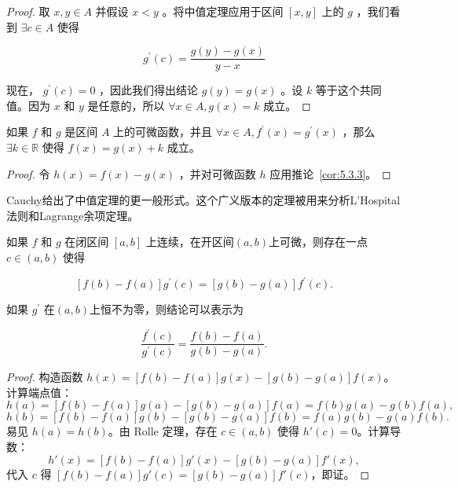 \begin{proof}
取 \(x,y \in  A\) 并假设 \(x < y\) 。将中值定理应用于区间 \(\left\lbrack  {x,y}\right\rbrack\) 上的 \(g\) ，我们看到 $\exists c\in A$ 使得

\[
{g}^{\prime }\left( c\right)  = \frac{g\left( y\right)  - g\left( x\right) }{y - x}
\]

现在， \({g}^{\prime }\left( c\right)  = 0\) ，因此我们得出结论 \(g\left( y\right)  = g\left( x\right)\) 。设 \(k\) 等于这个共同值。因为 \(x\) 和 \(y\) 是任意的，所以 \(\forall x \in  A,  g\left( x\right)  = k\) 成立。
\end{proof}


\begin{Cor}
  \label{cor:5.3.4}
  如果 \(f\) 和 \(g\) 是区间 \(A\) 上的可微函数，并且 \(\forall x \in  A, {f}^{\prime }\left( x\right)  = {g}^{\prime }\left( x\right)\) ，那么 \(\exists k \in  \mathbb{R}\) 使得 \(f\left( x\right)  = g\left( x\right)  + k\) 成立。
\end{Cor}

\begin{proof}
  令 \(h\left( x\right)  = f\left( x\right)  - g\left( x\right)\) ，并对可微函数 \(h\) 应用推论~\ref{cor:5.3.3}。
\end{proof}

Cauchy给出了中值定理的更一般形式。这个广义版本的定理被用来分析L'Hospital法则和Lagrange余项定理。

\begin{Thm}[广义中值定理]
  \label{thm:5.3.5}
如果 \(f\) 和 \(g\) 在闭区间 \(\left\lbrack  {a,b}\right\rbrack\) 上连续，在开区间$(a, b)$上可微，则存在一点 \(c \in  \left( {a,b}\right)\) 使得

\[
\left\lbrack  {f\left( b\right)  - f\left( a\right) }\right\rbrack  {g}^{\prime }\left( c\right)  = \left\lbrack  {g\left( b\right)  - g\left( a\right) }\right\rbrack  {f}^{\prime }\left( c\right) .
\]  
\end{Thm}

如果 \({g}^{\prime }\) 在$(a, b)$上恒不为零，则结论可以表示为

\[
\frac{{f}^{\prime }\left( c\right) }{{g}^{\prime }\left( c\right) } = \frac{f\left( b\right)  - f\left( a\right) }{g\left( b\right)  - g\left( a\right) }.
\]

\begin{proof}
  构造函数 \(h(x) = [f(b) - f(a)]g(x) - [g(b) - g(a)]f(x)\)。计算端点值：
  \[
  h(a) = [f(b)-f(a)]g(a) - [g(b)-g(a)]f(a) = f(b)g(a) - g(b)f(a),
  \]
  \[
  h(b) = [f(b)-f(a)]g(b) - [g(b)-g(a)]f(b) = f(a)g(b) - g(a)f(b).
  \]
  易见 \(h(a) = h(b)\)。由 Rolle 定理，存在 \(c \in (a,b)\) 使得 \(h'(c) = 0\)。计算导数：
  \[
  h'(x) = [f(b)-f(a)]g'(x) - [g(b)-g(a)]f'(x),
  \]
  代入 \(c\) 得 \([f(b)-f(a)]g'(c) = [g(b)-g(a)]f'(c)\)，即证。
\end{proof}


